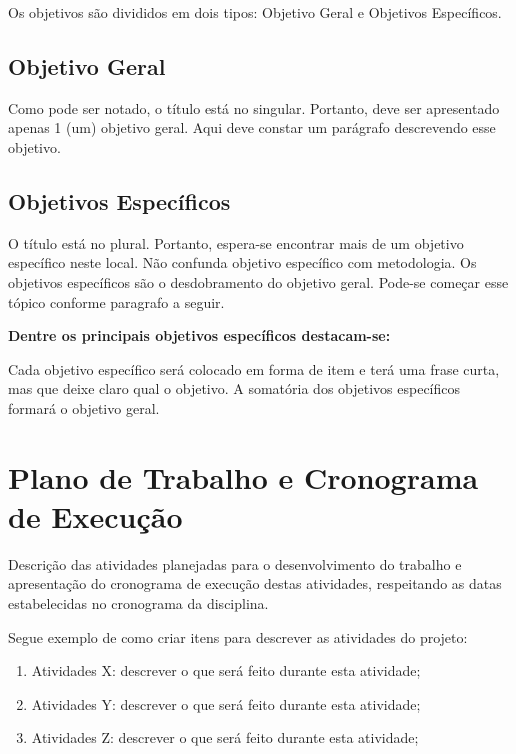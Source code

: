 \documentclass[
	12pt,				%
	a4paper,			%
	english,			%
	brazil,				%
	]{article}
\begin{document}
Os objetivos são divididos em dois tipos: Objetivo Geral e Objetivos Específicos.

\subsection{Objetivo Geral}

Como pode ser notado, o título está no singular. Portanto, deve ser apresentado apenas 1 (um) objetivo geral. Aqui deve constar um parágrafo descrevendo esse objetivo.

\subsection{Objetivos Específicos}

O título está no plural. Portanto, espera-se encontrar mais de um objetivo específico neste local. Não confunda objetivo específico com metodologia. 
Os objetivos específicos são o desdobramento do objetivo geral. Pode-se começar esse tópico conforme paragrafo a seguir.

{\bf Dentre os principais objetivos específicos destacam-se: }

Cada objetivo específico será colocado em forma de item e terá uma frase curta, mas que deixe claro qual o objetivo.
A somatória dos objetivos específicos formará o objetivo geral.


    	
\section{Plano de Trabalho e Cronograma de Execução}
	
	Descrição das atividades planejadas para o desenvolvimento do trabalho e apresentação do cronograma de 
execução destas atividades, respeitando as datas estabelecidas no cronograma da disciplina.


	Segue exemplo de como criar itens para descrever as atividades do projeto:

    \begin{enumerate}

        \item Atividades X: descrever o que será feito durante esta atividade;   \label{a1}
        
        \item Atividades Y: descrever o que será feito durante esta atividade;   \label{a2}

        \item Atividades Z: descrever o que será feito durante esta atividade;   \label{a3}

    \end{enumerate}
\end{document}
